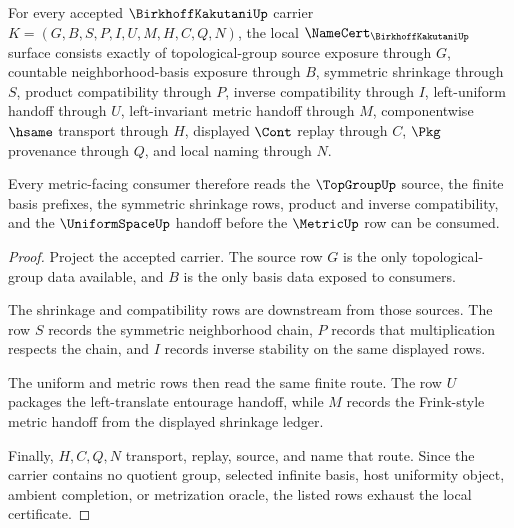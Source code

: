 \begin{theorem}
\label{thm:birkhoff-kakutani-namecert-obligations}
For every accepted $\BirkhoffKakutaniUp$ carrier $K=(G,B,S,P,I,U,M,H,C,Q,N)$, the local $\NameCert_{\BirkhoffKakutaniUp}$ surface consists exactly of topological-group source exposure through $G$, countable neighborhood-basis exposure through $B$, symmetric shrinkage through $S$, product compatibility through $P$, inverse compatibility through $I$, left-uniform handoff through $U$, left-invariant metric handoff through $M$, componentwise $\hsame$ transport through $H$, displayed $\Cont$ replay through $C$, $\Pkg$ provenance through $Q$, and local naming through $N$.

Every metric-facing consumer therefore reads the $\TopGroupUp$ source, the finite basis prefixes, the symmetric shrinkage rows, product and inverse compatibility, and the $\UniformSpaceUp$ handoff before the $\MetricUp$ row can be consumed.
\end{theorem}
\begin{proof}
Project the accepted carrier. The source row $G$ is the only topological-group data available, and $B$ is the only basis data exposed to consumers.

The shrinkage and compatibility rows are downstream from those sources. The row $S$ records the symmetric neighborhood chain, $P$ records that multiplication respects the chain, and $I$ records inverse stability on the same displayed rows.

The uniform and metric rows then read the same finite route. The row $U$ packages the left-translate entourage handoff, while $M$ records the Frink-style metric handoff from the displayed shrinkage ledger.

Finally, $H,C,Q,N$ transport, replay, source, and name that route. Since the carrier contains no quotient group, selected infinite basis, host uniformity object, ambient completion, or metrization oracle, the listed rows exhaust the local certificate.
\end{proof}


